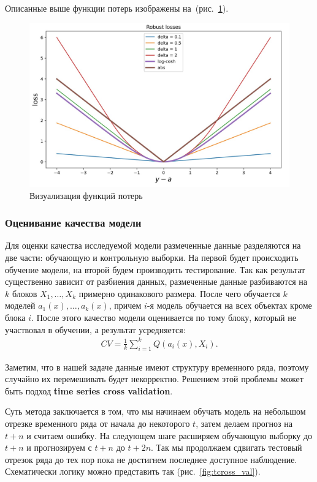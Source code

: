 \documentclass[12pt,a4paper]{article} %
\begin{document}
Описанные выше функции потерь изображены на~(рис.~\ref{fig:loss_func}).

\begin{figure}[h]
	
	\centering
	
	\includegraphics[width=0.7\linewidth]{loss_func.jpg}
	
	\caption{Визуализация функций потерь}
	
	\label{fig:loss_func}
	
\end{figure}

\subsubsection{Оценивание качества модели}

Для оценки качества исследуемой модели размеченные данные разделяются на две части: обучающую и контрольную выборки. На первой будет происходить обучение модели, на второй будем производить тестирование. Так как результат существенно зависит от разбиения данных, размеченные данные разбиваются на $k$ блоков $X_1, \dots, X_k$ примерно одинакового размера. После чего обучается $k$ моделей $a_1(x), \dots, a_k(x)$, причем $i$-я модель обучается на всех объектах кроме блока $i$. После этого качество модели оценивается по тому блоку, который не участвовал в обучении, а результат усредняется:
 \begin{gather}\label{modelquality}
	CV = \frac{1}{k}\sum\limits_{i=1}^{k}Q(a_i(x), X_i).
\end{gather}

Заметим, что в нашей задаче данные имеют структуру временного ряда, поэтому случайно их перемешивать будет некорректно. Решением этой проблемы может быть подход \textbf{time series cross validation}.

Суть метода заключается в том, что мы начинаем обучать модель на небольшом отрезке временного ряда от начала до некоторого $t$, затем делаем прогноз на $t+n$ и считаем ошибку. На следующем шаге расширяем обучающую выборку до $t+n$ и прогнозируем с $t+n$ до $t+2n$. Так мы продолжаем сдвигать тестовый отрезок ряда до тех пор пока не достигнем последнее доступное наблюдение. Схематически логику можно представить так (рис.~\ref{fig:tcross_val}). 
\end{document}
